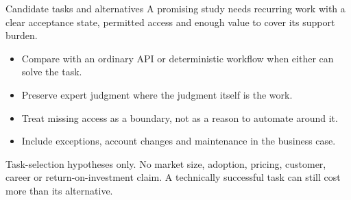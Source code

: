 \begin{frame}[label=market]{Candidate tasks and alternatives}
A promising study needs recurring work with a clear acceptance state, permitted
access and enough value to cover its support burden.
\medskip
\begin{itemize}
\item Compare with an ordinary API or deterministic workflow when either can solve the task.
\item Preserve expert judgment where the judgment itself is the work.
\item Treat missing access as a boundary, not as a reason to automate around it.
\item Include exceptions, account changes and maintenance in the business case.
\end{itemize}
\vfill
{\footnotesize Task-selection hypotheses only. No market size, adoption, pricing,
customer, career or return-on-investment claim. A technically successful task can
still cost more than its alternative.}
\end{frame}
